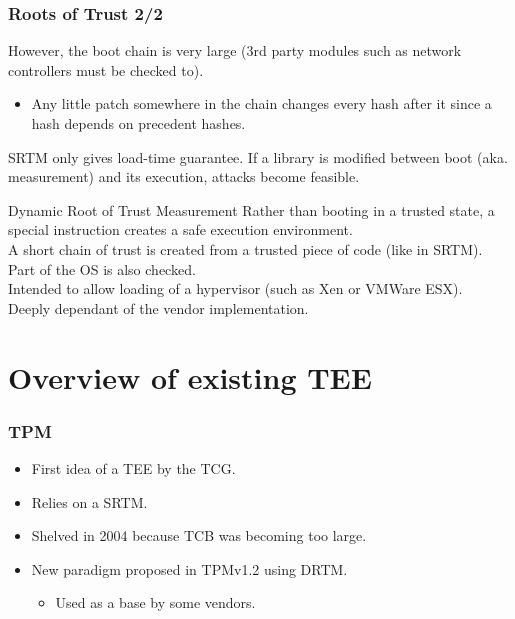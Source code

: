 \documentclass{beamer}
\begin{document}
\begin{frame}
    \frametitle{Roots of Trust 2/2}

    However, the boot chain is very large (3rd party modules such as network controllers must be checked to).
    \begin{itemize}
        \item Any little patch somewhere in the chain changes every hash after it since a hash depends on precedent hashes.\\
    \end{itemize}
    SRTM only gives load-time guarantee. If a library is modified between boot (aka. measurement) and its execution, attacks become feasible.

    \begin{block}{Dynamic Root of Trust Measurement}
        Rather than booting in a trusted state, a special instruction creates a safe execution environment.\\
        A short chain of trust is created from a trusted piece of code (like in SRTM).\\
        Part of the OS is also checked.\\
        Intended to allow loading of a hypervisor (such as Xen or VMWare ESX).\\
        Deeply dependant of the vendor implementation.
    \end{block}
\end{frame}

\section{Overview of existing TEE}

\begin{frame}
    \tableofcontents[currentsection]
\end{frame}

\begin{frame}
    \frametitle{TPM}

    \vfill
    \begin{itemize}
        \item First idea of a TEE by the TCG.
        \vfill
        \item Relies on a SRTM.
        \vfill
        \item Shelved in 2004 because TCB was becoming too large.
        \vfill
        \item New paradigm proposed in TPMv1.2 using DRTM.
        \begin{itemize}
            \item Used as a base by some vendors.
        \end{itemize}
    \end{itemize}
    \vfill
\end{frame}
\end{document}
